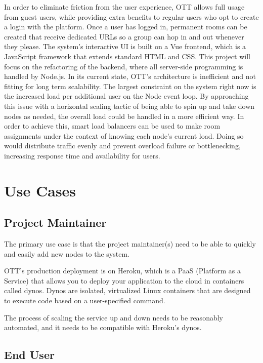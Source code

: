 In order to eliminate friction from the user experience, OTT allows full usage from guest users, while providing extra
benefits to regular users who opt to create a login with the platform. Once a user has logged in, permanent rooms can
be created that receive dedicated URLs so a group can hop in and out whenever they please. The system's interactive UI
is built on a Vue frontend, which is a JavaScript framework that extends standard HTML and CSS. This project will focus
on the refactoring of the backend, where all server-side programming is handled by Node.js. In its current state, OTT's
architecture is inefficient and not fitting for long term scalability. The largest constraint on the system right now is
the increased load per additional user on the Node event loop. By approaching this issue with a horizontal scaling tactic
of being able to spin up and take down nodes as needed, the overall load could be handled in a more efficient way. In
order to achieve this, smart load balancers can be used to make room assignments under the context of knowing each node's
current load. Doing so would distribute traffic evenly and prevent overload failure or bottlenecking, increasing response
time and availability for users.


\section{Use Cases}

\subsection{Project Maintainer}

The primary use case is that the project maintainer(s) need to be able to quickly and easily add new nodes to the system.

OTT's production deployment is on Heroku, which is a PaaS (Platform as a Service) that allows you to deploy your application to the
cloud in containers called dynos. Dynos are isolated, virtualized Linux containers that are designed to execute code based on a
user-specified command.

The process of scaling the service up and down needs to be reasonably automated, and it needs to be compatible with Heroku's dynos.

\subsection{End User}


